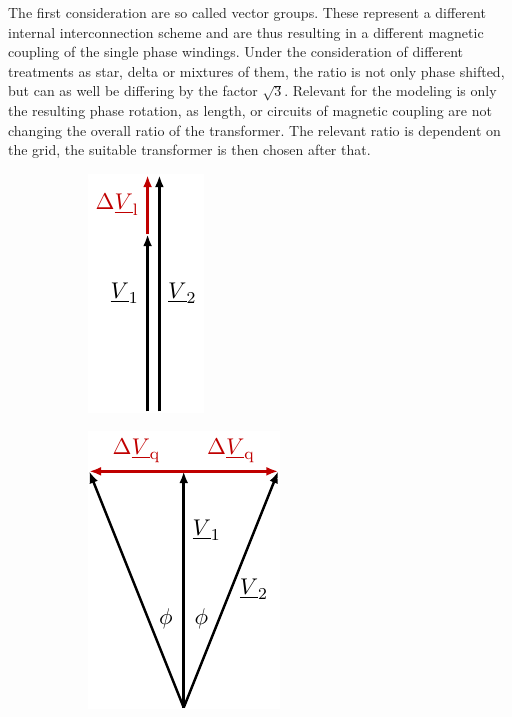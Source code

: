 The first consideration are so called vector groups.
These represent a different internal interconnection scheme and are thus resulting in a different magnetic coupling of the single phase windings.
Under the consideration of different treatments as star, delta or mixtures of them, the ratio is not only phase shifted, but can as well be differing by the factor $\sqrt{3}$. 
Relevant for the modeling is only the resulting phase rotation, as length, or circuits of magnetic coupling are not changing the overall ratio of the transformer.
The relevant ratio is dependent on the grid, the suitable transformer is then chosen after that.

\begin{figure}[htb!]
        \centering
        \begin{subfigure}[b]{0.29\linewidth}
            \centering
            \includegraphics{tikz_graphics/images/vectors_normal.pdf}
        \end{subfigure}
        \begin{subfigure}[b]{0.29\linewidth}
            \centering
            \includegraphics{tikz_graphics/images/vectors_phase_shifter.pdf}

\end{subfigure}
\end{figure}
